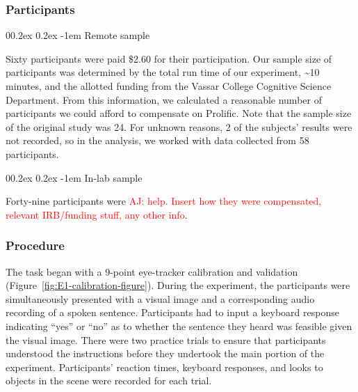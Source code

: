 \documentclass[
  man,floatsintext]{apa6}
\makeatletter
\let\oldparagraph\paragraph
\renewcommand{\paragraph}[1]{\oldparagraph{#1}\mbox{}}
\renewcommand{\paragraph}{\@startsection{paragraph}{4}{\parindent}%
  {0\baselineskip \@plus 0.2ex \@minus 0.2ex}%
  {-1em}%
  {\normalfont\normalsize\bfseries\itshape\typesectitle}}
\makeatother
\begin{document}
\hypertarget{participants-1}{%
\subsubsection{Participants}\label{participants-1}}

\hypertarget{remote-sample}{%
\paragraph{Remote sample}\label{remote-sample}}

Sixty participants were paid \$2.60 for their participation. Our sample size
of participants was determined by the total run time of our experiment,
\textasciitilde10 minutes, and the allotted funding from the Vassar College Cognitive
Science Department. From this information, we calculated a reasonable
number of participants we could afford to compensate on Prolific. Note
that the sample size of the original study was 24. For unknown reasons,
2 of the subjects' results were not recorded, so in the analysis, we
worked with data collected from 58 participants.

\hypertarget{in-lab-sample}{%
\paragraph{In-lab sample}\label{in-lab-sample}}

Forty-nine participants were \textcolor{red}{AJ: help. Insert how they were compensated, relevant IRB/funding stuff, any other info}.

\hypertarget{procedure}{%
\subsubsection{Procedure}\label{procedure}}

The task began with a 9-point eye-tracker calibration
and validation (Figure~\ref{fig:E1-calibration-figure}).
During the experiment, the participants were
simultaneously presented with a visual image and a corresponding audio
recording of a spoken sentence. Participants had to input a keyboard
response indicating ``yes'' or ``no'' as to whether the sentence they heard
was feasible given the visual image. There were two practice trials to
ensure that participants understood the instructions
before they undertook the main portion of the experiment. Participants'
reaction times, keyboard responses, and looks to objects in the scene
were recorded for each trial.
\end{document}
